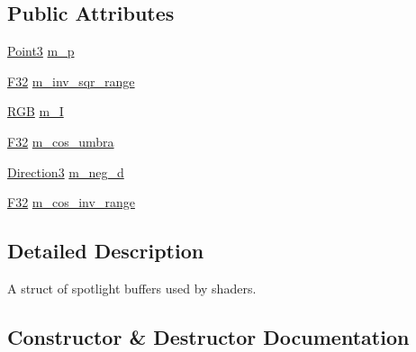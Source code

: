 \subsection*{Public Attributes}
\begin{DoxyCompactItemize}
\item 
\hyperlink{structmage_1_1_point3}{Point3} \hyperlink{structmage_1_1rendering_1_1_spot_light_buffer_aea38ba213d99bbdf0c36ce27bc0c64c5}{m\+\_\+p}
\item 
\hyperlink{namespacemage_aa97e833b45f06d60a0a9c4fc22ae02c0}{F32} \hyperlink{structmage_1_1rendering_1_1_spot_light_buffer_a279a981f476ecbc4efd875626071d046}{m\+\_\+inv\+\_\+sqr\+\_\+range}
\item 
\hyperlink{structmage_1_1_r_g_b}{R\+GB} \hyperlink{structmage_1_1rendering_1_1_spot_light_buffer_ab67a7ecde450e0096563c4be789156c9}{m\+\_\+I}
\item 
\hyperlink{namespacemage_aa97e833b45f06d60a0a9c4fc22ae02c0}{F32} \hyperlink{structmage_1_1rendering_1_1_spot_light_buffer_afa3c23903a4b31bf6b7da537d7f9b660}{m\+\_\+cos\+\_\+umbra}
\item 
\hyperlink{structmage_1_1_direction3}{Direction3} \hyperlink{structmage_1_1rendering_1_1_spot_light_buffer_a0a52ef76133f10b93030f86ce628b334}{m\+\_\+neg\+\_\+d}
\item 
\hyperlink{namespacemage_aa97e833b45f06d60a0a9c4fc22ae02c0}{F32} \hyperlink{structmage_1_1rendering_1_1_spot_light_buffer_a80c169b3f3e87c7d91a7b2b4473e4136}{m\+\_\+cos\+\_\+inv\+\_\+range}
\end{DoxyCompactItemize}


\subsection{Detailed Description}
A struct of spotlight buffers used by shaders. 

\subsection{Constructor \& Destructor Documentation}
\hypertarget{structmage_1_1rendering_1_1_spot_light_buffer_a603e2c40ae924a2183f24604297715aa}{}\label{structmage_1_1rendering_1_1_spot_light_buffer_a603e2c40ae924a2183f24604297715aa} 

